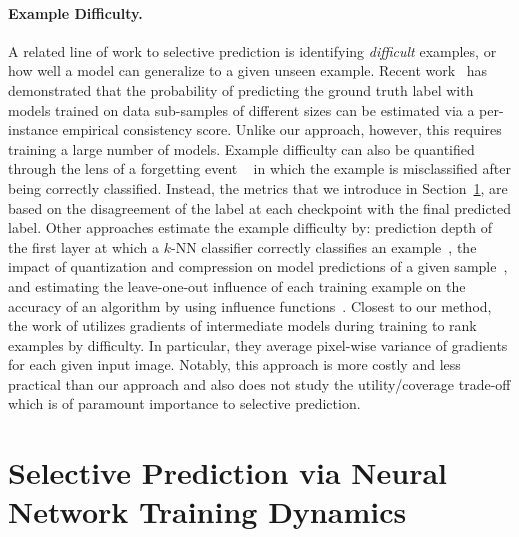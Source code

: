 \paragraph{Example Difficulty.}
\label{sec:example_diff}

A related line of work to selective prediction is identifying \emph{difficult} examples, or how well a model can generalize to a given unseen example. Recent work~\cite{jiang2020characterizing} has demonstrated that the probability of predicting the ground truth label with models trained on data sub-samples of different sizes can be estimated via a per-instance empirical consistency score. Unlike our approach, however, this requires training a large number of models. 
Example difficulty can also be quantified through the lens of a forgetting event ~\cite{toneva2018empirical} in which the example is misclassified after being correctly classified. Instead, the metrics that we introduce in Section~\ref{sec:method}, are based on the disagreement of the label at each checkpoint with the final predicted label. Other approaches estimate the example difficulty by: 
prediction depth of the first layer at which a $k$-NN classifier correctly classifies an example~\citep{baldock2021deep}, the impact of quantization and compression on model predictions of a given sample~\citep{hooker2019compressed}, and estimating the leave-one-out influence of each training example on the accuracy of an algorithm by using influence functions~\citep{feldman2020neural}. 
Closest to our method, the work of \cite{agarwal2020estimating} utilizes gradients of intermediate models during training to rank examples by  difficulty. In particular, they average pixel-wise variance of gradients for each given input image. 
Notably, this approach is more costly and less practical than our approach and also does not study the utility/coverage trade-off which is of paramount importance to selective prediction.


\section{Selective Prediction via Neural Network Training Dynamics}
\label{sec:method}

